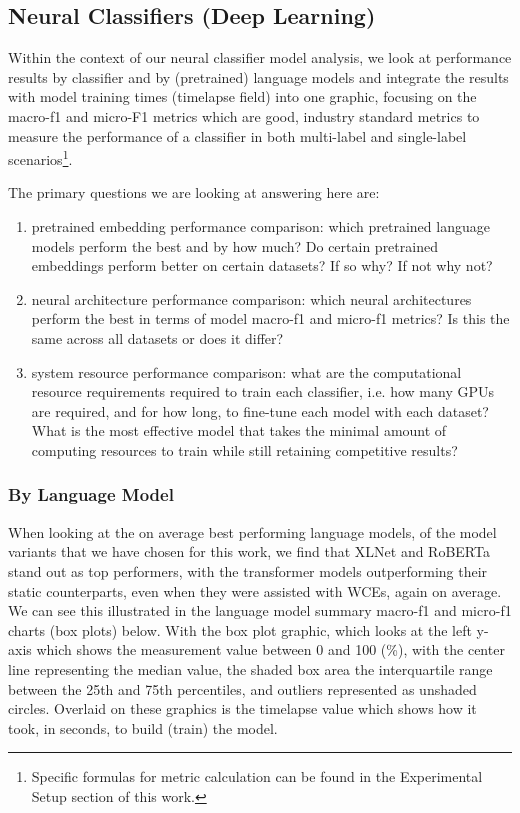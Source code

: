 \documentclass[final]{clv2025}
\begin{document}
\subsection{Neural Classifiers (Deep Learning)}

Within the context of our neural classifier model analysis, we look at performance results by classifier and by (pretrained) language models and integrate the results with model training times (timelapse field) into one graphic, focusing on the macro-f1 and micro-F1 metrics which are good, industry standard metrics to measure the performance of a classifier in both multi-label and single-label scenarios\footnote{Specific formulas for metric calculation can be found in the Experimental Setup section of this work.}.  

The primary questions we are looking at answering here are:

\begin{enumerate}
    \item pretrained embedding performance comparison: which pretrained language models perform the best and by how much? Do certain pretrained embeddings perform better on certain datasets? If so why? If not why not?
    \item 	neural architecture performance comparison: which neural architectures perform the best in terms of model macro-f1 and micro-f1 metrics? Is this the same across all datasets or does it differ?
    \item system resource performance comparison: what are the computational resource requirements required to train each classifier, i.e. how many GPUs are required, and for how long, to fine-tune each model with each dataset? What is the most effective model that takes the minimal amount of computing resources to train while still retaining competitive results?
\end{enumerate}

\subsubsection{By Language Model} 

When looking at the on average best performing language models, of the model variants that we have chosen for this work, we find that XLNet and RoBERTa stand out as top performers, with the transformer models outperforming their static counterparts, even when they were assisted with WCEs, again on average. We can see this illustrated in the language model summary macro-f1 and micro-f1 charts (box plots) below. With the box plot graphic, which looks at the left y-axis which shows the measurement value between 0 and 100 (\%), with the center line representing the median value, the shaded box area the interquartile range between the 25th and 75th percentiles, and outliers represented as unshaded circles. Overlaid on these graphics is the timelapse value which shows how it took, in seconds, to build (train) the model.
\end{document}
